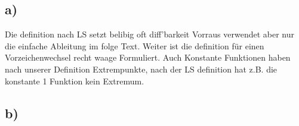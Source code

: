 \documentclass[12pt,a4paper,oneside,ngerman]{article}
\begin{document}
\subsection*{a)}

Die definition nach LS setzt belibig oft diff'barkeit Vorraus verwendet aber nur die einfache Ableitung im folge Text.
Weiter ist die definition für einen Vorzeichenwechsel recht waage Formuliert.
Auch Konstante Funktionen haben nach unserer Definition Extrempunkte, nach der LS definition
hat z.B. die konstante 1 Funktion kein Extremum.


\subsection*{b)}
	
\end{document}
